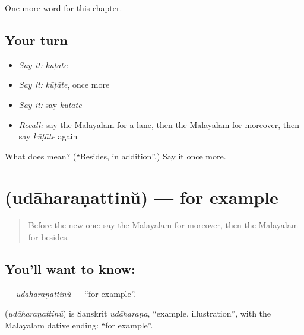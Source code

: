 \begin{grammarlens}[title={What you've built}]
One more word for this chapter.
\end{grammarlens}

\subsection*{Your turn}
\begin{itemize}
\raggedright
  \item \emph{Say it:} \emph{kūṭāte}
  \item \emph{Say it:} \emph{kūṭāte}, once more
  \item \emph{Say it:} say \emph{kūṭāte}
  \item \emph{Recall:} say the Malayalam for a lane, then the Malayalam for moreover, then say \emph{kūṭāte} again
\end{itemize}

\begin{tcolorbox}[breakable,colback=teal!4,colframe=teal!35!black,title={Before you move on}]
What does  mean? (\textquotedblleft{}Besides, in addition\textquotedblright{}.) Say it once more.
\end{tcolorbox}
\section[\texorpdfstring{\ml{ഉദാഹരണത്തിന്} (udāharaṇattinŭ)}{ഉദാഹരണത്തിന് (udāharaṇattinŭ)}]{ (udāharaṇattinŭ) — for example}

\label{lesson:ML-C281-udaharanattinu}



\begin{quote}
Before the new one: say the Malayalam for moreover, then the Malayalam for besides.
\end{quote}

\subsection*{You'll want to know: }
\textbf{} — \emph{udāharaṇattinŭ} — \textquotedblleft{}for example\textquotedblright{}.

\begin{cousinweb}
\textbf{} (\emph{udāharaṇattinŭ}) is Sanskrit \emph{udāharaṇa}, \textquotedblleft{}example, illustration\textquotedblright{}, with the Malayalam dative ending: \textquotedblleft{}for example\textquotedblright{}.
\end{cousinweb}

